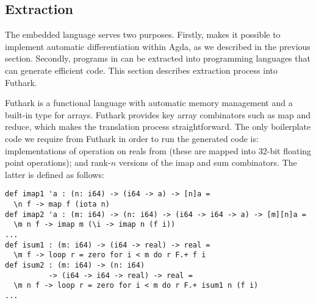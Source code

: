 % 
\subsection{Extraction\label{sec:extraction}}

The embedded language  serves two purposes.
Firstly,  makes it possible to implement automatic differentiation
within Agda, as we described in the previous section.
Secondly, programs in  can be extracted into
programming languages that can generate efficient code.  This
section describes extraction process into Futhark.

Futhark is a functional language with automatic memory management and
a built-in type for arrays.  Futhark provides key array combinators such as
map and reduce, which makes the translation process straightforward.
The only boilerplate code we require from Futhark in order
to run the generated code is: implementations of operation on reals
from  (these are mapped into 32-bit floating point operations);
and rank-$n$ versions of the imap and sum combinators.  The latter is defined
as follows:
\begin{Verbatim}
def imap1 'a : (n: i64) -> (i64 -> a) -> [n]a =
  \n f -> map f (iota n)
def imap2 'a : (m: i64) -> (n: i64) -> (i64 -> i64 -> a) -> [m][n]a =
  \m n f -> imap m (\i -> imap n (f i))
...
def isum1 : (m: i64) -> (i64 -> real) -> real =
  \m f -> loop r = zero for i < m do r F.+ f i
def isum2 : (m: i64) -> (n: i64)
          -> (i64 -> i64 -> real) -> real =
  \m n f -> loop r = zero for i < m do r F.+ isum1 n (f i)
...
\end{Verbatim}


